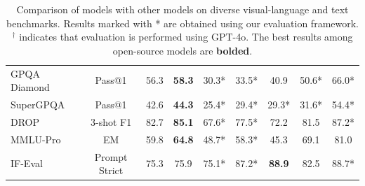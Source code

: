 \begin{table}[htbp]
{\begin{tabular}{l c | S[table-format=2.1] S[table-format=2.1] | S[table-format=2.1] S[table-format=2.1] S[table-format=2.1] | S[table-format=2.1] S[table-format=2.1]}
    GPQA Diamond                          & Pass@1       & 56.3 & \textbf{58.3} & 30.3* & 33.5* & 40.9  & 50.6* & 66.0* \\
    SuperGPQA                             & Pass@1       & 42.6 & \textbf{44.3}      & 25.4* & 29.4* & 29.3* & 31.6* & 54.4* \\
    DROP                                  & 3-shot F1    & 82.7 & \textbf{85.1} & 67.6* & 77.5* & 72.2  & 81.5  & 87.2* \\
    MMLU-Pro                              & EM           & 59.8 &  \textbf{64.8}     & 48.7* & 58.3* & 45.3  & 69.1  & 81.0  \\
    IF-Eval                               & Prompt Strict& 75.3 &   75.9    & 75.1* & 87.2* & \textbf{88.9} & 82.5  & 88.7* \\
    \bottomrule
    \end{tabular}
}
    \caption{
        Comparison of \mimovl{} models with other models on diverse visual-language and text benchmarks.
        Results marked with * are obtained using our evaluation framework. $^{\dag}$ indicates that evaluation is performed using GPT-4o. The best results among open-source models are \textbf{bolded}.
    }
    \label{tab:general_updated} %
\end{table}





    
    







   
   







